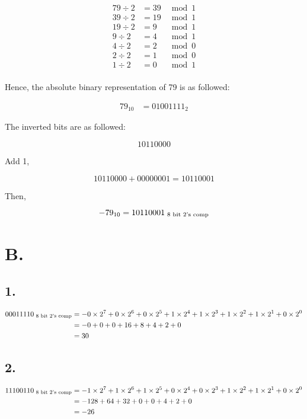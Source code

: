 \documentclass[10pt]{article}
\begin{document}
$$
\begin{aligned}
79 \div 2 & =39 & \bmod 1 \\
39 \div 2 & =19 & \bmod 1 \\
19 \div 2 & =9 & \bmod 1 \\
9 \div 2 & =4 & \bmod 1 \\
4 \div 2 & =2 & \bmod 0 \\
2 \div 2 & =1 & \bmod 0 \\
1 \div 2 & =0 & \bmod 1 \\
\end{aligned}
$$

Hence, the absolute binary representation of 79 is as followed:

$$
\begin{aligned}
79_{10} & =01001111_{2}
\end{aligned}
$$

The inverted bits are as followed:

$$
10110000
$$

Add 1,

$$
10110000+00000001=10110001
$$

Then,

$$
-79_{10}=10110001 \textsubscript{ 8 bit 2's comp}
$$

\section*{B.}
\subsection*{1.}

$$
\begin{aligned}
00011110 \textsubscript{ 8 bit 2's comp} & =
-0 \times 2^{7}
+0 \times 2^{6}
+0 \times 2^{5}
+1 \times 2^{4}
+1 \times 2^{3}
+1 \times 2^{2}
+1 \times 2^{1}
+0 \times 2^{0} \\
& =-0+0+0+16+8+4+2+0 \\
& =30
\end{aligned}
$$

\subsection*{2.}


$$
\begin{aligned}
11100110 \textsubscript{ 8 bit 2's comp} & =
-1 \times 2^{7}
+1 \times 2^{6}
+1 \times 2^{5}
+0 \times 2^{4}
+0 \times 2^{3}
+1 \times 2^{2}
+1 \times 2^{1}
+0 \times 2^{0} \\
& =-128+64+32+0+0+4+2+0 \\
& =-26
\end{aligned}
$$
\end{document}
